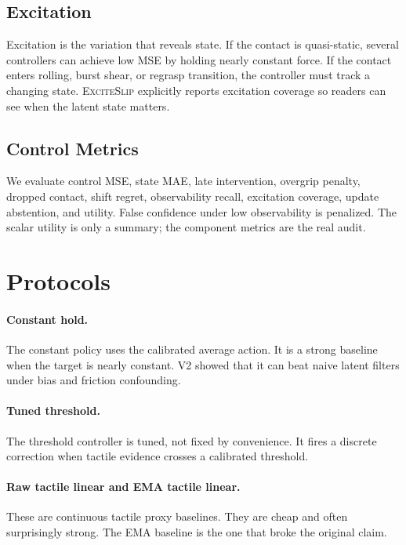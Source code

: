 \documentclass{article}
\newcommand{\method}{\textsc{ExciteSlip}\xspace}
\begin{document}
\subsection{Excitation}

Excitation is the variation that reveals state. If the contact is quasi-static, several controllers can achieve low MSE by holding nearly constant force. If the contact enters rolling, burst shear, or regrasp transition, the controller must track a changing state. \method explicitly reports excitation coverage so readers can see when the latent state matters.

\subsection{Control Metrics}

We evaluate control MSE, state MAE, late intervention, overgrip penalty, dropped contact, shift regret, observability recall, excitation coverage, update abstention, and utility. False confidence under low observability is penalized. The scalar utility is only a summary; the component metrics are the real audit.

\section{Protocols}

\paragraph{Constant hold.}
The constant policy uses the calibrated average action. It is a strong baseline when the target is nearly constant. V2 showed that it can beat naive latent filters under bias and friction confounding.

\paragraph{Tuned threshold.}
The threshold controller is tuned, not fixed by convenience. It fires a discrete correction when tactile evidence crosses a calibrated threshold.

\paragraph{Raw tactile linear and EMA tactile linear.}
These are continuous tactile proxy baselines. They are cheap and often surprisingly strong. The EMA baseline is the one that broke the original claim.
\end{document}
